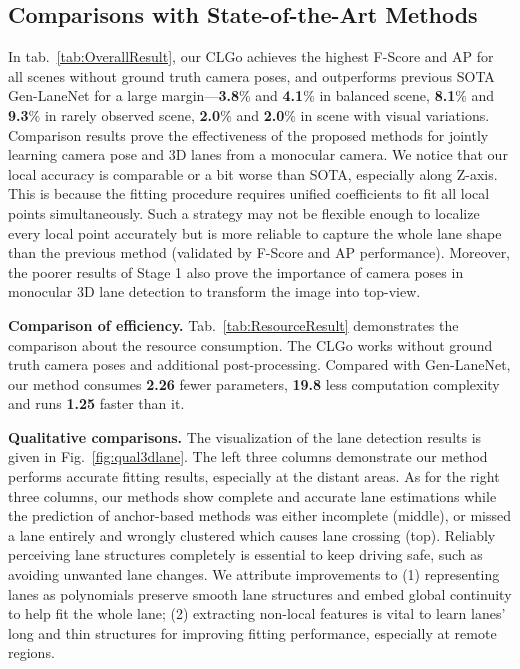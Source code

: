 \documentclass[letterpaper]{article} \usepackage{aaai22}  \usepackage{times}  \usepackage{helvet}  \usepackage{courier}  \usepackage[hyphens]{url}  \usepackage{graphicx} \urlstyle{rm} \def\UrlFont{\rm}  \usepackage{natbib}  \usepackage{caption}
\begin{document}
\subsection{Comparisons with State-of-the-Art Methods}
In tab.~\ref{tab:OverallResult}, our CLGo achieves the highest F-Score and AP for all scenes without ground truth camera poses, and outperforms previous SOTA Gen-LaneNet for a large margin---\textbf{3.8}\% and \textbf{4.1}\% in balanced scene, \textbf{8.1}\% and \textbf{9.3}\% in rarely observed scene, \textbf{2.0}\% and \textbf{2.0}\% in scene with visual variations. Comparison results prove the effectiveness of the proposed methods for jointly learning camera pose and 3D lanes from a monocular camera. 
We notice that our local accuracy is comparable or a bit worse than SOTA, especially along Z-axis. This is because the fitting procedure requires unified coefficients to fit all local points simultaneously. Such a strategy may not be flexible enough to localize every local point accurately but is more reliable to capture the whole lane shape than the previous method (validated by F-Score and AP performance). 
Moreover, the poorer results of Stage 1 also prove the importance of camera poses in monocular 3D lane detection to transform the image into top-view.  

\noindent \textbf{Comparison of efficiency.}
Tab.~\ref{tab:ResourceResult} demonstrates the comparison about the resource consumption. The CLGo works without ground truth camera poses and additional post-processing. Compared with Gen-LaneNet, our method consumes \textbf{2.26} fewer parameters, \textbf{19.8} less computation complexity and runs \textbf{1.25}  faster than it.


\noindent \textbf{Qualitative comparisons.}
The visualization of the lane detection results is given in Fig.~\ref{fig:qual3dlane}. The left three columns demonstrate our method performs accurate fitting results, especially at the distant areas. As for the right three columns, our methods show complete and accurate lane estimations while the prediction of anchor-based methods was either incomplete (middle), or missed a lane entirely and wrongly clustered which causes lane crossing (top). Reliably perceiving lane structures completely is essential to keep driving safe, such as avoiding unwanted lane changes. We attribute improvements to (1) representing lanes as polynomials preserve smooth lane structures and embed global continuity to help fit the whole lane; (2) extracting non-local features is vital to learn lanes' long and thin structures for improving fitting performance, especially at remote regions.
\end{document}
